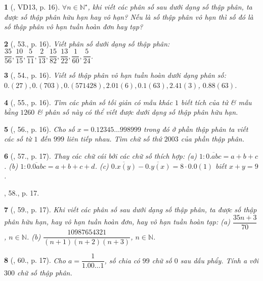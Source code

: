 \documentclass{article}
\newtheorem{baitoan}{}
\begin{document}
\begin{baitoan}[\cite{Binh_Toan_7_tap_1}, VD13, p. 16]
	$\forall n\in\mathbb{N}^\star$, khi viết các phân số sau dưới dạng số thập phân, ta được số thập phân hữu hạn hay vô hạn? Nếu là số thập phân vô hạn thì số đó là số thập phân vô hạn tuần hoàn đơn hay tạp?
\end{baitoan}

\begin{baitoan}[\cite{Binh_Toan_7_tap_1}, 53., p. 16]
	Viết phân số dưới dạng số thập phân: $\dfrac{35}{56},\dfrac{10}{15},\dfrac{5}{11},\dfrac{2}{13},\dfrac{15}{82},\dfrac{13}{22},\dfrac{1}{60},\dfrac{5}{24}$.
\end{baitoan}

\begin{baitoan}[\cite{Binh_Toan_7_tap_1}, 54., p. 16]
	Viết số thập phân vô hạn tuần hoàn dưới dạng phân số: $0.(27),0.(703),0.(571428),2.01(6),0.1(63),2.41(3)$, $0.88(63)$.
\end{baitoan}

\begin{baitoan}[\cite{Binh_Toan_7_tap_1}, 55., p. 16]
	Tìm các phân số tối giản có mẫu khác $1$ biết tích của tử \& mẫu bằng $1260$ \& phân số này có thể viết được dưới dạng số thập phân hữu hạn.
\end{baitoan}

\begin{baitoan}[\cite{Binh_Toan_7_tap_1}, 56., p. 16]
	Cho số $x = 0.12345\ldots998999$ trong đó ở phần thập phân ta viết các số từ $1$ đến $999$ liên tiếp nhau. Tìm chữ số thứ $2003$ của phần thập phân.
\end{baitoan}

\begin{baitoan}[\cite{Binh_Toan_7_tap_1}, 57., p. 17]
	Thay các chữ cái bởi các chữ số thích hợp: (a) $1:\overline{0.abc} = a + b + c$. (b) $1:\overline{0.0abc} = a + b + c + d$. (c) $\overline{0.x(y)} - \overline{0.y(x)} = 8\cdot0.0(1)$ biết $x + y = 9$.
\end{baitoan}
\cite{Binh_Toan_7_tap_1}, 58., p. 17.

\begin{baitoan}[\cite{Binh_Toan_7_tap_1}, 59., p. 17]
	Khi viết các phân số sau dưới dạng số thập phân, ta được số thập phân hữu hạn, hay vô hạn tuần hoàn đơn, hay vô hạn tuần hoàn tạp: (a) $\dfrac{35n + 3}{70}$, $n\in\mathbb{N}$. (b) $\dfrac{10987654321}{(n + 1)(n + 2)(n + 3)}$, $n\in\mathbb{N}$.
\end{baitoan}

\begin{baitoan}[\cite{Binh_Toan_7_tap_1}, 60., p. 17]
	Cho $a = \dfrac{1}{1.00\ldots1}$, số chia có $99$ chữ số $0$ sau dấu phẩy. Tính a với $300$ chữ số thập phân.
\end{baitoan}
\end{document}
